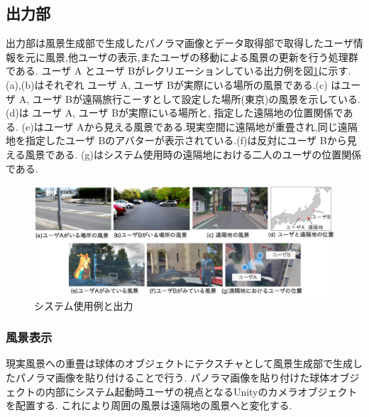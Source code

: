 \subsection{出力部}
出力部は風景生成部で生成したパノラマ画像とデータ取得部で取得したユーザ情報を元に風景,他ユーザの表示,またユーザの移動による風景の更新を行う処理群である. ユーザ A とユーザ Bがレクリエーションしている出力例を図\ref{figure:output}に示す.
(a),(b)はそれぞれ ユーザ A, ユーザ Bが実際にいる場所の風景である.(c) はユーザ A, ユーザ Bが遠隔旅行こーすとして設定した場所(東京)の風景を示している.(d)は ユーザ A, ユーザ Bが実際にいる場所と, 指定した遠隔地の位置関係である. (e)はユーザ Aから見える風景である.現実空間に遠隔地が重畳され,同じ遠隔地を指定したユーザ Bのアバターが表示されている.(f)は反対にユーザ Bから見える風景である. (g)はシステム使用時の遠隔地における二人のユーザの位置関係である.

\begin{figure}[ht]
\begin{center}
\includegraphics[width=17cm]{img/04_detail/output.eps}
\end{center}
\caption{システム使用例と出力}
\label{figure:output}
\end{figure} 

\subsubsection{風景表示}
現実風景への重畳は球体のオブジェクトにテクスチャとして風景生成部で生成したパノラマ画像を貼り付けることで行う.
パノラマ画像を貼り付けた球体オブジェクトの内部にシステム起動時ユーザの視点となるUnityのカメラオブジェクトを配置する.
これにより周囲の風景は遠隔地の風景へと変化する.


\clearpage

